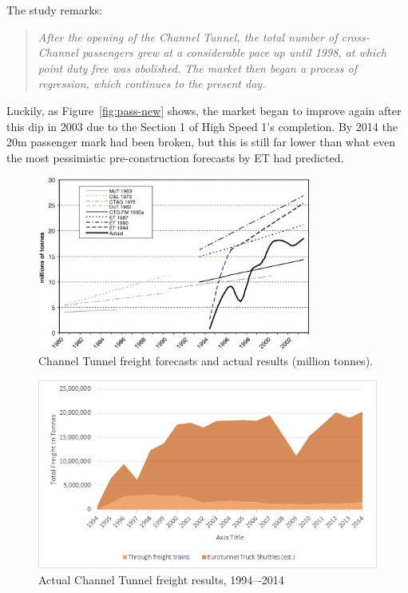 \documentclass[12pt]{article} %
\begin{document}
The study remarks:
\begin{quote}
\textit{After the opening of the Channel Tunnel, the total number of cross-Channel passengers grew at a considerable pace up until 1998, at which point duty free was abolished. The market then began a process of regression, which continues to the present day.}
\end{quote}

Luckily, as Figure~\ref{fig:pass-new} shows, the market began to improve again after this dip in 2003 due to the Section 1 of High Speed 1's completion. By 2014 the 20m passenger mark had been broken, but this is still far lower than what even the most pessimistic pre-construction forecasts by ET had predicted.

\begin{figure}[htp]
  \centering
  \includegraphics[width=0.8\textwidth]{freight}
  \caption{Channel Tunnel freight forecasts and actual results (million tonnes).}
  \label{fig:freight-fore}
\end{figure}

\begin{figure}[htp]
  \centering
  \includegraphics[width=\textwidth]{freight-new}
  \caption{Actual Channel Tunnel freight results, 1994–-2014}
  \label{fig:freight-new}
\end{figure}
\end{document}
